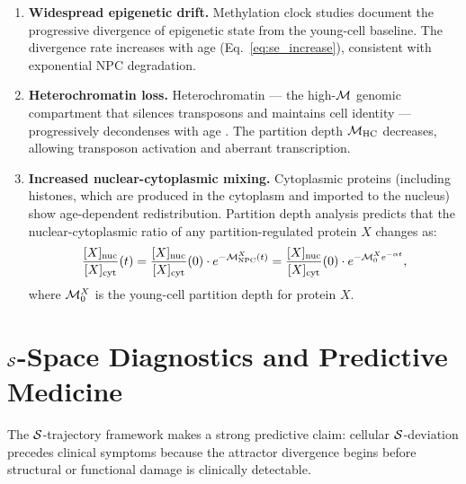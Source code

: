 \begin{enumerate}
  \item \textbf{Widespread epigenetic drift.} Methylation clock studies
        \citep{Horvath2013} document the progressive divergence of epigenetic
        state from the young-cell baseline. The divergence rate increases with
        age (Eq.~\eqref{eq:se_increase}), consistent with exponential NPC
        degradation.

  \item \textbf{Heterochromatin loss.} Heterochromatin --- the high-$\mathcal{M}$
        genomic compartment that silences transposons and maintains cell
        identity --- progressively decondenses with age \citep{Sedivy2013}.
        The partition depth $\mathcal{M}_{\mathrm{HC}}$ decreases, allowing
        transposon activation and aberrant transcription.

  \item \textbf{Increased nuclear-cytoplasmic mixing.} Cytoplasmic proteins
        (including histones, which are produced in the cytoplasm and imported
        to the nucleus) show age-dependent redistribution. Partition depth
        analysis predicts that the nuclear-cytoplasmic ratio of any
        partition-regulated protein $X$ changes as:
        \begin{equation}
          \frac{[X]_{\mathrm{nuc}}}{[X]_{\mathrm{cyt}}}(t)
            = \frac{[X]_{\mathrm{nuc}}}{[X]_{\mathrm{cyt}}}(0)
              \cdot e^{-\mathcal{M}_{\mathrm{NPC}}^X(t)}
              = \frac{[X]_{\mathrm{nuc}}}{[X]_{\mathrm{cyt}}}(0)
              \cdot e^{-\mathcal{M}_0^X e^{-\alpha t}},
          \label{eq:nc_mixing}
        \end{equation}
        where $\mathcal{M}_0^X$ is the young-cell partition depth for protein $X$.
\end{enumerate}

\section{\texorpdfstring{$\mathcal{S}$}{S}-Space Diagnostics and Predictive Medicine}
\label{sec:sspace_diagnostics}

The $\mathcal{S}$-trajectory framework makes a strong predictive claim: cellular
$\mathcal{S}$-deviation precedes clinical symptoms because the attractor divergence
begins before structural or functional damage is clinically detectable.

